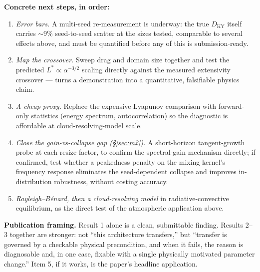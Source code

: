 \documentclass[11pt]{article}
\newcommand{\DKY}{D_{\mathrm{KY}}}
\begin{document}
\textbf{Concrete next steps, in order:}
\begin{enumerate}[nosep]
\item \emph{Error bars.} A multi-seed re-measurement is underway: the
  true $\DKY$ itself carries $\sim$9\% seed-to-seed scatter at the sizes
  tested, comparable to several effects above, and must be quantified
  before any of this is submission-ready.
\item \emph{Map the crossover.} Sweep drag and domain size together and
  test the predicted $L^*\propto\alpha^{-3/2}$ scaling directly against
  the measured extensivity crossover --- turns a demonstration into a
  quantitative, falsifiable physics claim.
\item \emph{A cheap proxy.} Replace the expensive Lyapunov comparison
  with forward-only statistics (energy spectrum, autocorrelation) so the
  diagnostic is affordable at cloud-resolving-model scale.
\item \emph{Close the gain-vs-collapse gap (\S\ref{sec:m2}).} A
  short-horizon tangent-growth probe at each resize factor, to confirm
  the spectral-gain mechanism directly; if confirmed, test whether a
  peakedness penalty on the mixing kernel's frequency response
  eliminates the seed-dependent collapse and improves in-distribution
  robustness, without costing accuracy.
\item \emph{Rayleigh--B\'enard, then a cloud-resolving model} in
  radiative-convective equilibrium, as the direct test of the
  atmospheric application above.
\end{enumerate}

\textbf{Publication framing.} Result 1 alone is a clean, submittable
finding. Results 2--3 together are stronger: not ``this architecture
transfers,'' but ``transfer is governed by a checkable physical
precondition, and when it fails, the reason is diagnosable and, in one
case, fixable with a single physically motivated parameter change.''
Item 5, if it works, is the paper's headline application.
\end{document}
